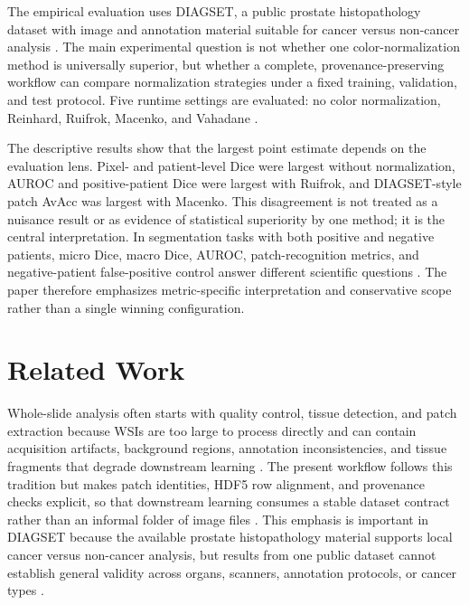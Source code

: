 \documentclass[a4paper,fleqn]{cas-dc}
\begin{document}
The empirical evaluation uses DIAGSET, a public prostate histopathology dataset with image and annotation material suitable for cancer versus non-cancer analysis \cite{koziarski2024diagset}. The main experimental question is not whether one color-normalization method is universally superior, but whether a complete, provenance-preserving workflow can compare normalization strategies under a fixed training, validation, and test protocol. Five runtime settings are evaluated: no color normalization, Reinhard, Ruifrok, Macenko, and Vahadane \cite{reinhard2001color,ruifrok2001quantification,macenko2009method,vahadane2016structure}.

The descriptive results show that the largest point estimate depends on the evaluation lens. Pixel- and patient-level Dice were largest without normalization, AUROC and positive-patient Dice were largest with Ruifrok, and DIAGSET-style patch AvAcc was largest with Macenko. This disagreement is not treated as a nuisance result or as evidence of statistical superiority by one method; it is the central interpretation. In segmentation tasks with both positive and negative patients, micro Dice, macro Dice, AUROC, patch-recognition metrics, and negative-patient false-positive control answer different scientific questions \cite{saito2015precision,fawcett2006roc,seghier2024dice}. The paper therefore emphasizes metric-specific interpretation and conservative scope rather than a single winning configuration.

\section{Related Work}

Whole-slide analysis often starts with quality control, tissue detection, and patch extraction because WSIs are too large to process directly and can contain acquisition artifacts, background regions, annotation inconsistencies, and tissue fragments that degrade downstream learning \cite{weng2024grandqc,munozaguirre2020pyhist,khened2021generalized}. The present workflow follows this tradition but makes patch identities, HDF5 row alignment, and provenance checks explicit, so that downstream learning consumes a stable dataset contract rather than an informal folder of image files \cite{folk2011hdf5,wilkinson2016fair}. This emphasis is important in DIAGSET because the available prostate histopathology material supports local cancer versus non-cancer analysis, but results from one public dataset cannot establish general validity across organs, scanners, annotation protocols, or cancer types \cite{koziarski2024diagset}.
\end{document}
